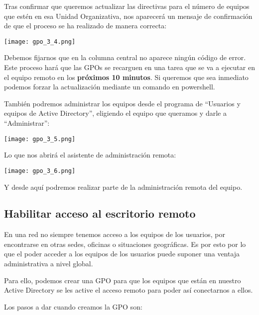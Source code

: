 Tras confirmar que queremos actualizar las directivas para el número de equipos que estén en esa Unidad Organizativa, nos aparecerá un mensaje de confirmación de que el proceso se ha realizado de manera correcta:

\begin{center}
    \texttt{[image: gpo\_3\_4.png]}
\end{center}

Debemos fijarnos que en la columna central no aparece ningún código de error. Este proceso hará que las GPOs se recarguen en una tarea que se va a ejecutar en el equipo remoto en los \textbf{próximos 10 minutos}. Si queremos que sea inmediato podemos forzar la actualización mediante un comando en powershell.

También podremos administrar los equipos desde el programa de “Usuarios y equipos de Active Directory”, eligiendo el equipo que queramos y darle a “Administrar”:

\begin{center}
    \texttt{[image: gpo\_3\_5.png]}
\end{center}

Lo que nos abrirá el asistente de administración remota:

\begin{center}
    \texttt{[image: gpo\_3\_6.png]}
\end{center}

Y desde aquí podremos realizar parte de la administración remota del equipo.


\subsection{Habilitar acceso al escritorio remoto}
En una red no siempre tenemos acceso a los equipos de los usuarios, por encontrarse en otras sedes, oficinas o situaciones geográficas. Es por esto por lo que el poder acceder a los equipos de los usuarios puede suponer una ventaja administrativa a nivel global.

Para ello, podemos crear una GPO para que los equipos que están en nuestro Active Directory se les active el acceso remoto para poder así conectarnos a ellos.

Los pasos a dar cuando creamos la GPO son:

